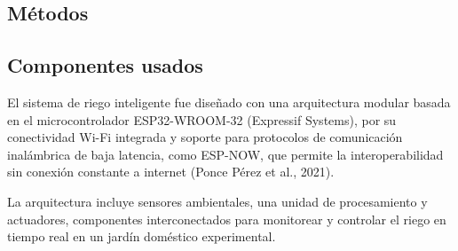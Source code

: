 \documentclass[pdflatex,sn-mathphys-num]{sn-jnl}%
\theoremstyle{thmstyleone}%
\theoremstyle{thmstyletwo}%
\theoremstyle{thmstylethree}%
\begin{document}
\begin{multicols}{2}
\section*{Métodos}

\subsection*{Componentes usados}

El sistema de riego inteligente fue diseñado con una arquitectura modular basada en el microcontrolador ESP32-WROOM-32 (Expressif Systems), por su conectividad Wi-Fi integrada y soporte para protocolos de comunicación inalámbrica de baja latencia, como ESP-NOW, que permite la interoperabilidad sin conexión constante a internet (Ponce Pérez et al., 2021). 

La arquitectura incluye sensores ambientales, una unidad de procesamiento y actuadores, componentes interconectados para monitorear y controlar el riego en tiempo real en un jardín doméstico experimental.


\end{multicols}
\end{document}
